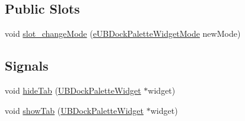 \subsection*{Public Slots}
\begin{DoxyCompactItemize}
\item 
void \hyperlink{class_u_b_dock_palette_widget_a68887a6b0fab1f085c51212e2ad36ce6}{slot\-\_\-change\-Mode} (\hyperlink{_u_b_dock_palette_widget_8h_af3b2828ed1bf91ad13c73e4e1b3b529e}{e\-U\-B\-Dock\-Palette\-Widget\-Mode} new\-Mode)
\end{DoxyCompactItemize}
\subsection*{Signals}
\begin{DoxyCompactItemize}
\item 
void \hyperlink{class_u_b_dock_palette_widget_ac6d1dd80c372227051c835dc6bbc64fd}{hide\-Tab} (\hyperlink{class_u_b_dock_palette_widget}{U\-B\-Dock\-Palette\-Widget} $\ast$widget)
\item 
void \hyperlink{class_u_b_dock_palette_widget_aba3521bff44ff86eeaf70eaa0e1e57b2}{show\-Tab} (\hyperlink{class_u_b_dock_palette_widget}{U\-B\-Dock\-Palette\-Widget} $\ast$widget)
\end{DoxyCompactItemize}
